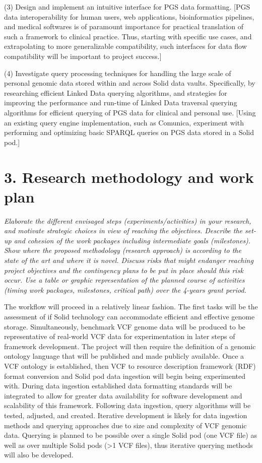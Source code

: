 \documentclass{article}
\begin{document}
(3) Design and implement an intuitive interface for PGS data formatting. [PGS data interoperability for human users, web applications, bioinformatics pipelines, and medical softwares is of paramount importance for practical translation of such a framework to clinical practice. Thus, starting with specific use cases, and extrapolating to more generalizable compatibility, such interfaces for data flow compatibility will be important to project success.]

(4) Investigate query processing techniques for handling the large scale of personal genomic data stored within and across Solid data vaults. Specifically, by researching efficient Linked Data querying algorithms, and strategies for improving the performance and run-time of Linked Data traversal querying algorithms for efficient querying of PGS data for clinical and personal use. [Using an existing query engine implementation, such as Comunica, experiment with performing and optimizing basic SPARQL queries on PGS data stored in a Solid pod.]



\section{3. Research methodology and work plan}
\textit{Elaborate the different envisaged steps (experiments/activities) in your research, and motivate strategic choices in view of reaching the objectives. Describe the set-up and cohesion of the work packages including intermediate goals (milestones).
Show where the proposed methodology (research approach) is according to the state of the art and where it is novel. Discuss risks that might endanger reaching project objectives and the contingency plans to be put in place should this risk occur.
Use a table or graphic representation of the planned course of activities (timing work packages, milestones, critical path) over the 4-years grant period.}

The workflow will proceed in a relatively linear fashion. The first tasks will be the assessment of if Solid technology can accommodate efficient and effective genome storage. Simultaneously, benchmark VCF genome data will be produced to be representative of real-world VCF data for experimentation in later steps of framework development. The project will then require the definition of a genomic ontology language that will be published and made publicly available. Once a VCF ontology is established, then VCF to resource description framework (RDF) format conversion and Solid pod data ingestion will begin being experimented with. During data ingestion established data formatting standards will be integrated to allow for greater data availability for software development and scalability of this framework. Following data ingestion, query algorithms will be tested, adjusted, and created. Iterative development is likely for data ingestion methods and querying approaches due to size and complexity of VCF genomic data. Querying is planned to be possible over a single Solid pod (one VCF file) as well as over multiple Solid pods (>1 VCF files), thus iterative querying methods will also be developed. 
\end{document}
